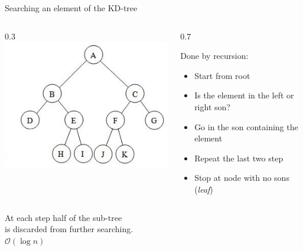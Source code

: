 \documentclass{beamer}
\newenvironment{changemargin}[2]{%
  \begin{list}{}{%
    \setlength{\topsep}{0pt}%
    \setlength{\leftmargin}{#1}%
    \setlength{\rightmargin}{#2}%
    \setlength{\listparindent}{\parindent}%
    \setlength{\itemindent}{\parindent}%
    \setlength{\parsep}{\parskip}%
  }%
  \item[]}{\end{list}}
\begin{document}
\begin{frame}{Searching an element of the KD-tree}
\begin{changemargin}{-1cm}{-2cm}
\begin{columns}
\begin{column}{0.3\textwidth}
\includegraphics[scale=0.35]{images/binary_tree2.jpg}
\end{column}
\begin{column}{0.7\textwidth}
\begin{center}
Done by recursion:
\begin{itemize}
\item Start from root
\item Is the element in the left or right son?
\item Go in the son containing the element
\item Repeat the last two step
\item Stop at node with no sons (\textit{leaf})
\end{itemize}
\end{center}
\end{column}
\end{columns}
\end{changemargin}
\begin{center}
\vspace{1cm}
At each step half of the sub-tree\\ is discarded from further searching.\\
\vspace{0.5cm}
$\mathcal{O}(\log{} n)$
\end{center}
\end{frame}
\end{document}
